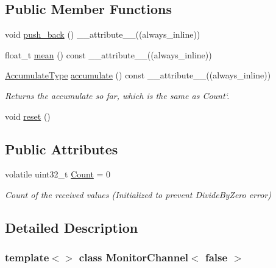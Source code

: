 \subsection*{Public Member Functions}
\begin{DoxyCompactItemize}
\item 
void \hyperlink{classMonitorChannel_3_01false_01_4_aec5ccac7dbda7816b5ddc163d6d4aa5b}{push\+\_\+back} () \+\_\+\+\_\+attribute\+\_\+\+\_\+((always\+\_\+inline))
\item 
float\+\_\+t \hyperlink{classMonitorChannel_3_01false_01_4_aff1c900b36c53bd674b53f94c3c2770b}{mean} () const \+\_\+\+\_\+attribute\+\_\+\+\_\+((always\+\_\+inline))
\item 
\hyperlink{classMonitorChannel_3_01false_01_4_a72d6a503399e9e8e986f0258d508a1b2}{Accumulate\+Type} \hyperlink{classMonitorChannel_3_01false_01_4_a55677fe669bca6b9382fc3baa73162b9}{accumulate} () const \+\_\+\+\_\+attribute\+\_\+\+\_\+((always\+\_\+inline))
\begin{DoxyCompactList}\small\item\em Returns the accumulate so far, which is the same as \textquotesingle{}Count`. \end{DoxyCompactList}\item 
void \hyperlink{classMonitorChannel_3_01false_01_4_a9310343e280b593894ac370932be4cbe}{reset} ()
\end{DoxyCompactItemize}
\subsection*{Public Attributes}
\begin{DoxyCompactItemize}
\item 
volatile uint32\+\_\+t \hyperlink{classMonitorChannel_3_01false_01_4_a9642a29309b4919130d0fb9573af3a05}{Count} = 0
\begin{DoxyCompactList}\small\item\em Count of the received values (Initialized to prevent Divide\+By\+Zero error) \end{DoxyCompactList}\end{DoxyCompactItemize}


\subsection{Detailed Description}
\subsubsection*{template$<$$>$\newline
class Monitor\+Channel$<$ false $>$}

